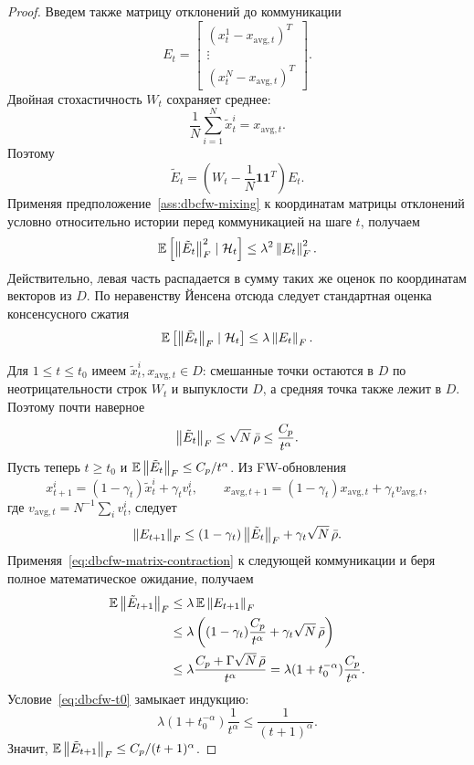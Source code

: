 \begin{proof}
Введем также матрицу отклонений до коммуникации
\[
    E_t=
    \begin{bmatrix}
        (x_t^1-x_{\mathrm{avg},t})^T\\
        \vdots\\
        (x_t^N-x_{\mathrm{avg},t})^T
    \end{bmatrix}.
\]
Двойная стохастичность $W_t$ сохраняет среднее:
\[
    \frac1N\sum_{i=1}^N\tilde x_t^i=x_{\mathrm{avg},t}.
\]
Поэтому
\[
    \tilde E_t
    =
    \left(W_t-\frac1N\mathbf 1\mathbf 1^T\right)E_t.
\]
Применяя предположение~\ref{ass:dbcfw-mixing} к координатам матрицы отклонений условно
относительно истории перед коммуникацией на шаге $t$, получаем
\[
    \mathbb{E}\left[\left\|\tilde E_t\right\|_F^2\mid \mathcal H_t\right]
    \leq
    \lambda^2\left\|E_t\right\|_F^2.
\]
Действительно, левая часть распадается в сумму таких же оценок по координатам
векторов из $D$.
По неравенству Йенсена отсюда следует стандартная оценка консенсусного сжатия
\begin{equation}
\label{eq:dbcfw-matrix-contraction}
    \mathbb{E}\left[\left\|\tilde E_t\right\|_F\mid \mathcal H_t\right]
    \leq
    \lambda\left\|E_t\right\|_F .
\end{equation}

Для $1\leq t\leq t_0$ имеем $\tilde x_t^i,x_{\mathrm{avg},t}\in D$: смешанные точки
остаются в $D$ по неотрицательности строк $W_t$ и выпуклости $D$, а средняя точка
также лежит в $D$.
Поэтому почти наверное
\[
    \left\|\tilde E_t\right\|_F\leq \sqrt N\,\bar\rho
    \leq
    \frac{C_p}{t^\alpha}.
\]
Пусть теперь $t\geq t_0$ и
$\mathbb{E}\left\|\tilde E_t\right\|_F\leq C_p/t^\alpha$.
Из FW-обновления
\[
    x_{t+1}^i=(1-\gamma_t)\tilde x_t^i+\gamma_t v_t^i,
    \qquad
    x_{\mathrm{avg},t+1}=(1-\gamma_t)x_{\mathrm{avg},t}
    +\gamma_t v_{\mathrm{avg},t},
\]
где $v_{\mathrm{avg},t}=N^{-1}\sum_i v_t^i$, следует
\[
    \left\|E_{t+1}\right\|_F
    \leq
    (1-\gamma_t)\left\|\tilde E_t\right\|_F
    +
    \gamma_t\sqrt N\,\bar\rho .
\]
Применяя~\eqref{eq:dbcfw-matrix-contraction} к следующей коммуникации и беря полное
математическое ожидание, получаем
\[
\begin{aligned}
    \mathbb{E}\left\|\tilde E_{t+1}\right\|_F
    &\leq
    \lambda\,\mathbb{E}\left\|E_{t+1}\right\|_F                                      \\
    &\leq
    \lambda
    \left(
        (1-\gamma_t)\frac{C_p}{t^\alpha}
        +
        \gamma_t\sqrt N\,\bar\rho
    \right)                                                          \\
    &\leq
    \lambda
    \frac{C_p+\Gamma\sqrt N\,\bar\rho}{t^\alpha}
    =
    \lambda(1+t_0^{-\alpha})\frac{C_p}{t^\alpha}.
\end{aligned}
\]
Условие~\eqref{eq:dbcfw-t0} замыкает индукцию:
\[
    \lambda(1+t_0^{-\alpha})\frac{1}{t^\alpha}
    \leq
    \frac{1}{(t+1)^\alpha}.
\]
Значит,
$\mathbb{E}\left\|\tilde E_{t+1}\right\|_F\leq C_p/(t+1)^\alpha$.
\end{proof}

